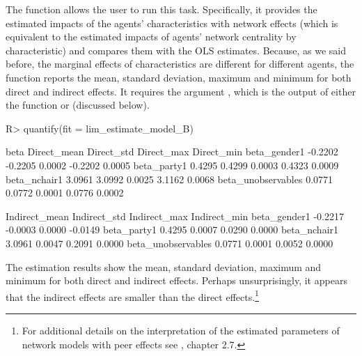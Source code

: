 \documentclass[nojss]{jss}
\begin{document}
The function  allows the user to run this task.
Specifically, it provides the estimated impacts of the agents'
characteristics with network effects (which is equivalent to the estimated impacts of agents' network centrality by characteristic) and compares them with the OLS estimates. Because, as we said before, the marginal effects of characteristics are different for different agents, the function  reports the mean, standard deviation, maximum and minimum for both direct and indirect effects. It
requires the argument , which is the output of either the function  or  (discussed below).
\begin{CodeChunk}
\begin{CodeInput}
R> quantify(fit = lim_estimate_model_B)
\end{CodeInput}
\begin{CodeOutput}
		  beta Direct_mean Direct_std Direct_max Direct_min 
beta_gender1      -0.2202 -0.2205  0.0002 -0.2202  0.0005
beta_party1        0.4295  0.4299  0.0003  0.4323  0.0009
beta_nchair1       3.0961  3.0992  0.0025  3.1162  0.0068
beta_unobservables 0.0771  0.0772  0.0001  0.0776  0.0002

		  Indirect_mean Indirect_std Indirect_max Indirect_min
beta_gender1      -0.2217 -0.0003  0.0000 -0.0149
beta_party1        0.4295  0.0007  0.0290  0.0000
beta_nchair1       3.0961  0.0047  0.2091  0.0000
beta_unobservables 0.0771  0.0001  0.0052  0.0000
\end{CodeOutput}
\end{CodeChunk}
The estimation results show the mean, standard deviation, maximum and minimum for both direct and indirect effects. Perhaps unsurprisingly, it appears that the indirect effects are smaller than the direct effects.\footnote{For additional details on the interpretation of the estimated parameters of network models with peer effects see \cite{LeSage:2009}, chapter 2.7.}
\end{document}
